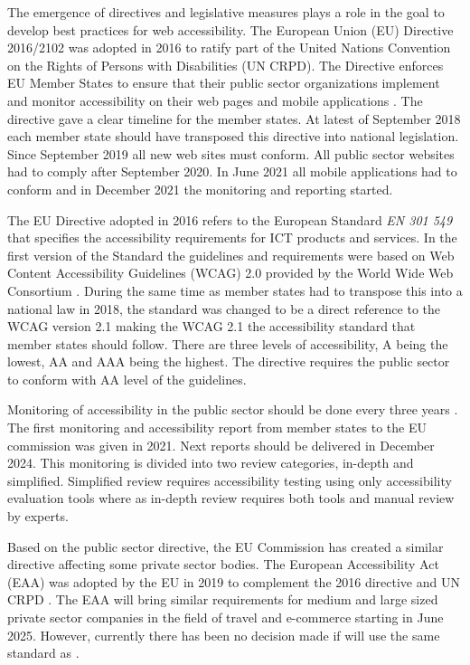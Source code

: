 The emergence of directives and legislative measures plays a role in the goal to develop best practices for web accessibility. The European Union (EU) Directive 2016/2102 was adopted in 2016 to ratify part of the United Nations Convention on the Rights of Persons with Disabilities (UN CRPD). The Directive enforces EU Member States to ensure that their public sector organizations implement and monitor accessibility on their web pages and mobile applications \citep{eudirective2016}. The directive gave a clear timeline for the member states. At latest of September 2018 each member state should have transposed this directive into national legislation. Since September 2019 all new web sites must conform. All public sector websites had to comply after September 2020. In June 2021 all mobile applications had to conform and in December 2021 the monitoring and reporting started. 

The EU Directive adopted in 2016 refers to the European Standard \textit{EN 301 549} that specifies the accessibility requirements for ICT products and services. In the first version of the Standard the guidelines and requirements were based on Web Content Accessibility Guidelines (WCAG) 2.0 provided by the World Wide Web Consortium \citep{wcagadoptioneurope}. During the same time as member states had to transpose this into a national law in 2018, the standard was changed to be a direct reference to the WCAG version 2.1 making the WCAG 2.1 the accessibility standard that member states should follow. There are three levels of accessibility, A being the lowest, AA and AAA being the highest. The directive requires the public sector to conform with AA level of the guidelines.

Monitoring of accessibility in the public sector should be done every three years \citep{eudirectivemonitoring}. The first monitoring and accessibility report from member states to the EU commission was given in 2021. Next reports should be delivered in December 2024. This monitoring is divided into two review categories, in-depth and simplified. Simplified review requires accessibility testing using only accessibility evaluation tools where as in-depth review requires both tools and manual review by experts. 

Based on the public sector directive, the EU Commission has created a similar directive affecting some private sector bodies. The European Accessibility Act (EAA) was adopted by the EU in 2019 to complement the 2016 directive and UN CRPD \citep{eudirective2019}. The EAA will bring similar requirements for medium and large sized private sector companies in the field of travel and e-commerce starting in June 2025. However, currently there has been no decision made if \cite{eudirective2019} will use the same standard as \cite{eudirective2016}.


